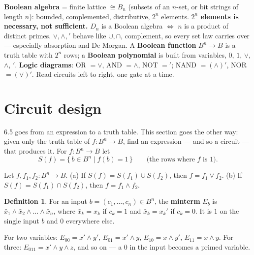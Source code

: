 \documentclass{fkt-notes}
\newcommand{\src}[1]{\par\noindent{\small\itshape Source: #1}\par\smallskip}
\newcommand{\kolman}[1]{\setcounter{section}{\numexpr#1-1\relax}}
\theoremstyle{definition}
\newtheorem*{defn}{Definition}
\begin{document}
\begin{keybox}[title=Key points (6.4--6.5)]
  \textbf{Boolean algebra} = finite lattice $\cong B_n$ (subsets of an
  $n$-set, or bit strings of length $n$): bounded, complemented,
  distributive, $2^n$ elements. \textbf{$2^n$ elements is necessary, not
    sufficient.} \textbf{$D_n$} is a Boolean algebra $\iff$ $n$ is a product
  of distinct primes. $\vee,\wedge,'$ behave like $\cup,\cap$, complement,
  so every set law carries over --- especially absorption and De Morgan.
  A \textbf{Boolean function} $B^n\to B$ is a truth table with $2^n$ rows;
  a \textbf{Boolean polynomial} is built from variables, $0$, $1$,
  $\vee$, $\wedge$, $'$. \textbf{Logic diagrams}: OR $=\vee$, AND
  $=\wedge$, NOT $='$; NAND $=(\wedge)'$, NOR $=(\vee)'$. Read circuits
  left to right, one gate at a time.
\end{keybox}

\kolman{6}
\section{Circuit design}\src{Kolman 6.6, pp.~284--292}
%

6.5 goes from an expression to a truth table. This section goes the other
way: given only the truth table of $f:B^n\to B$, find an expression ---
and so a circuit --- that produces it. For $f:B^n\to B$ let
\[
  S(f)=\{\,b\in B^n \mid f(b)=1\,\}\qquad\text{(the rows where $f$ is $1$).}
\]

\begin{rulebox}[title={6.6 Theorem 1}]
  Let $f,f_1,f_2:B^n\to B$.
  (a) If $S(f)=S(f_1)\cup S(f_2)$, then $f=f_1\vee f_2$.
  (b) If $S(f)=S(f_1)\cap S(f_2)$, then $f=f_1\wedge f_2$.
\end{rulebox}

\begin{defn}
  For an input $b=(c_1,\dots,c_n)\in B^n$, the \textbf{minterm} $E_b$ is
  $\bar x_1\wedge\bar x_2\wedge\dots\wedge\bar x_n$, where
  $\bar x_k=x_k$ if $c_k=1$ and $\bar x_k=x_k'$ if $c_k=0$. It is $1$ on
  the single input $b$ and $0$ everywhere else.
\end{defn}
For two variables: $E_{00}=x'\wedge y'$, $E_{01}=x'\wedge y$,
$E_{10}=x\wedge y'$, $E_{11}=x\wedge y$. For three:
$E_{011}=x'\wedge y\wedge z$, and so on --- a $0$ in the input becomes a
primed variable.
\end{document}
